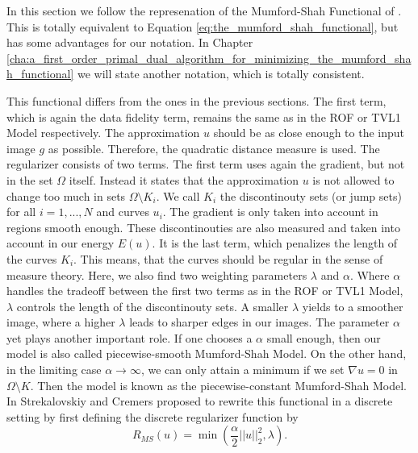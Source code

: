     \begin{remark}
        In this section we follow the represenation of the Mumford-Shah Functional of \cite{Strekalovskiy-Cremers-eccv14}. This is totally equivalent to Equation \ref{eq:the_mumford_shah_functional}, but has some advantages for our notation. In Chapter \ref{cha:a_first_order_primal_dual_algorithm_for_minimizing_the_mumford_shah_functional} we will state another notation, which is totally consistent.
    \end{remark}

    This functional differs from the ones in the previous sections. The first term, which is again the data fidelity term, remains the same as in the ROF or TVL1 Model respectively. The approximation $u$ should be as close enough to the input image $g$ as possible. Therefore, the quadratic distance measure is used. The regularizer consists of two terms. The first term uses again the gradient, but not in the set $\Omega$ itself. Instead it states that the approximation $u$ is not allowed to change too much in sets $\Omega \setminus K_{i}$. We call $K_{i}$ the discontinouty sets (or jump sets) for all $i = 1, ..., N$ and curves $u_{i}$. The gradient is only taken into account in regions smooth enough. These discontinouties are also measured and taken into account in our energy $E(u)$. It is the last term, which penalizes the length of the curves $K_{i}$. This means, that the curves should be regular in the sense of measure theory. Here, we also find two weighting parameters $\lambda$ and $\alpha$. Where $\alpha$ handles the tradeoff between the first two terms as in the ROF or TVL1 Model, $\lambda$ controls the length of the discontinouty sets. A smaller $\lambda$ yields to a smoother image, where a higher $\lambda$ leads to sharper edges in our images. The parameter $\alpha$ yet plays another important role. If one chooses a $\alpha$ small enough, then our model is also called piecewise-smooth Mumford-Shah Model. On the other hand, in the limiting case $\alpha \longrightarrow \infty$, we can only attain a minimum if we set $\nabla u = 0$ in $\Omega \setminus K$. Then the model is known as the piecewise-constant Mumford-Shah Model.
    In \cite{Strekalovskiy-Cremers-eccv14} Strekalovskiy and Cremers proposed to rewrite this functional in a discrete setting by first defining the discrete regularizer function by
        \begin{equation}
            R_{MS}(u) = \min(\frac{\alpha}{2}||u||_{2}^{2},\lambda).
        \label{eq:ms_regularizer}
        \end{equation}
